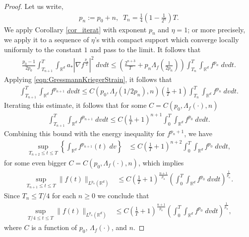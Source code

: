 \documentclass[12pt,american]{amsart}
\numberwithin{equation}{section}
\theoremstyle{plain}
\theoremstyle{definition}                  %
\begin{document}
\begin{proof}
  Let us write, 
  \begin{align*}	
    p_n  := p_0+n,\;\;T_{n} = \frac{1}{4}\left ( 1- \frac{1}{2^n} \right )T.
  \end{align*}	
  We apply Corollary \ref{cor_iterat} with exponent $p_n$ and  $\eta=1$; or more precisely, we apply it to a sequence of $\eta$'s with compact support which converge locally uniformly to the constant $1$ and pass to the limit. It follows that 
\begin{align*}
    \frac{p_0-1}{2p_0}\int_{T_{n+1}}^T\int_{\mathbb{R}^d}a_*|\nabla f^{\frac{p_n}{2}}|^2\;dvdt \leq \left ( \frac{2^{n+3}}{T}+ p_n\Lambda_f(\tfrac{1}{2p_n}) \right ) \int_{T_n}^T\int_{\mathbb{R}^d}  f^{p_n}\;dvdt.	
  \end{align*}
  Applying \eqref{eqn:GressmannKriegerStrain}, it follows that
  \begin{align*}
    \int_{T_{n+1}}^T \int_{\mathbb{R}^d} f^{p_{n+1}}\;dvdt \leq C(p_0,\Lambda_f(1/2p_n),n) \left ( \frac{1}{T} +1 \right ) \int_{T_n}^T\int_{\mathbb{R}^d} f^{p_n}\;dvdt.
  \end{align*}
  Iterating this estimate, it follows that for some $C=C(p_0,\Lambda_f(\cdot),n)$
    \begin{align*}
    \int_{T_{n+1}}^T \int_{\mathbb{R}^d} f^{p_{n+1}}\;dvdt \leq C \left ( \frac{1}{T} +1 \right )^{n+1} \int_{0}^T\int_{\mathbb{R}^d} f^{p_0}\;dvdt.
  \end{align*}
  Combining this bound with the energy inequality for $f^{p_n+1}$, we have
  \begin{align*}
   \sup_{T_{n+2} \leq t\leq T} \left \{ \int_{\mathbb{R}^d} f^{p_{n+1}}(t)\;dv \right \} &\leq C\left ( \frac{1}{T} +1 \right )^{n+2} \int_{0}^T\int_{\mathbb{R}^d} f^{p_0}\;dvdt,
  \end{align*}
  for some even bigger $C=C(p_0,\Lambda_f(\cdot),n)$, which implies
  \begin{align*}
    \sup \limits_{T_{n+1}\leq t\leq T} \|f(t)\|_{L^{p_n}(\mathbb{R}^d)}   & \leq C\left (\frac{1}{T}+1 \right )^{\frac{n+1}{p_n}}\left (\int_{0}^T\int_{\mathbb{R}^d} f^{p_0}\;dvdt \right )^{\frac{1}{p_n}}.
  \end{align*}	
  Since $T_n\leq T/4$ for each $n\ge 0$ we conclude that 
    \begin{align*}
    \sup \limits_{T/4\leq t\leq T} \|f(t)\|_{L^{p_n}(\mathbb{R}^d)}   & \leq C\left (\frac{1}{T}+1 \right )^{\frac{n+1}{p_n}}\left (\int_{0}^T\int_{\mathbb{R}^d} f^{p_0}\;dvdt \right )^{\frac{1}{p_n}},
  \end{align*}	
  where $C$ is a function of $p_0$, $\Lambda_f(\cdot)$, and $n$.
\end{proof}
\end{document}
